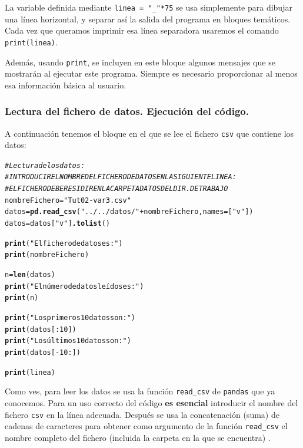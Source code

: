\documentclass[10pt,a4paper]{article}\usepackage[]{graphicx}\usepackage[]{color}
\makeatletter
\newcommand{\hlstr}[1]{\textcolor[rgb]{0.192,0.494,0.8}{#1}}%
\newcommand{\hlcom}[1]{\textcolor[rgb]{0.678,0.584,0.686}{\textit{#1}}}%
\newcommand{\hlkwd}[1]{\textcolor[rgb]{0.737,0.353,0.396}{\textbf{#1}}}%
\newenvironment{kframe}{%
 \def\at@end@of@kframe{}%
 \ifinner\ifhmode%
  \def\at@end@of@kframe{\end{minipage}}%
  \begin{minipage}{\columnwidth}%
 \fi\fi%
 \def\FrameCommand##1{\hskip\@totalleftmargin \hskip-\fboxsep
 \colorbox{shadecolor}{##1}\hskip-\fboxsep
     \hskip-\linewidth \hskip-\@totalleftmargin \hskip\columnwidth}%
 \MakeFramed {\advance\hsize-\width
   \@totalleftmargin\z@ \linewidth\hsize
   \@setminipage}}%
 {\par\unskip\endMakeFramed%
 \at@end@of@kframe}
\newenvironment{knitrout}{}{} %
\newcounter {cont01}
\makeatother
\begin{document}
La variable definida mediante \verb&linea = "_"*75& se usa simplemente para dibujar una línea horizontal, y separar así la salida del programa en bloques temáticos. Cada vez que queramos imprimir esa línea separadora usaremos el comando {\tt print(linea)}.

Además, usando {\tt print}, se incluyen en este bloque algunos mensajes que se mostrarán al ejecutar este programa. Siempre es necesario proporcionar al menos esa información básica al usuario.

\subsubsection*{Lectura del fichero de datos. Ejecución del código.}
\label{tut02:subsubsec:lecturaDatos}

A continuación tenemos el bloque en el que se lee el fichero {\tt csv} que contiene los datos:
\begin{knitrout}
\color{fgcolor}\begin{kframe}
\begin{alltt}
\hlcom{# Lectura de los datos:}
\hlcom{# INTRODUCIR EL NOMBRE DEL FICHERO DE DATOS EN LA SIGUIENTE LINEA:}
\hlcom{# EL FICHERO DEBE RESIDIR EN LA CARPETA DATOS DEL DIR. DE TRABAJO}
nombreFichero = \hlstr{"Tut02-var3.csv"}
datos = \hlkwd{pd.read_csv}(\hlstr{"../../datos/"} + nombreFichero, names=[\hlstr{"v"}])
datos = datos[\hlstr{"v"}]\hlkwd{.tolist}()

\hlkwd{print}(\hlstr{"El fichero de datos es:"})
\hlkwd{print}(nombreFichero)

n = \hlkwd{len}(datos)
\hlkwd{print}(\hlstr{"El número de datos leídos es:"})
\hlkwd{print}(n)

\hlkwd{print}(\hlstr{"Los primeros 10 datos son:"})
\hlkwd{print}(datos[:10])
\hlkwd{print}(\hlstr{"Los últimos 10 datos son:"})
\hlkwd{print}(datos[-10:])

\hlkwd{print}(linea)
\end{alltt}
\end{kframe}
\end{knitrout}
Como ves, para leer los datos se usa la función \verb&read_csv& de {\tt pandas} que ya conocemos. Para un uso correcto del código {\bf es esencial} introducir el nombre del fichero {\tt csv} en la línea adecuada. Después se usa la concatenación (suma) de cadenas de caracteres para obtener como argumento de la función \verb&read_csv& el nombre completo del fichero (incluida la carpeta en la que se encuentra) .
\end{document}
